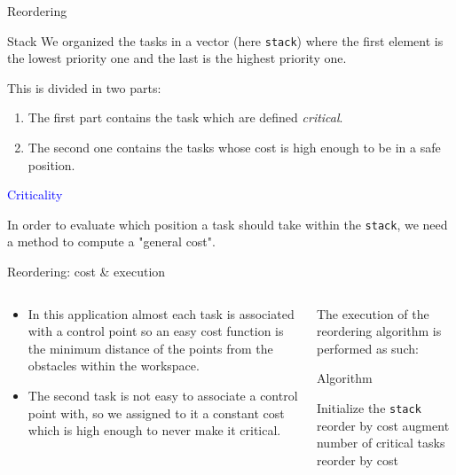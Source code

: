 \documentclass[11pt]{beamer}
\begin{document}
\begin{frame}{Reordering}

\begin{block}{Stack}
We organized the tasks in a vector (here \texttt{stack}) where the first element is the lowest priority one and the last is the highest priority one.
\end{block}
This is divided in two parts:
\begin{enumerate}
\item The first part contains the task which are defined \textit{critical}.
\item The second one contains the tasks whose cost is high enough to be in a safe position.
\end{enumerate}

\textcolor{blue}{Criticality}

In order to evaluate which position a task should take within the \texttt{stack}, we need a method to compute a "general cost".
\end{frame}

\begin{frame}{Reordering: cost \& execution}
\begin{columns}

\begin{column}{.4\textwidth}
\begin{itemize}
\item In this application almost each task is associated with a control point so an easy cost function is the minimum distance of the points from the obstacles within the workspace.
\item The second task is not easy to associate a control point with, so we assigned to it a constant cost which is high enough to never make it critical.
\end{itemize}
\end{column}

\begin{column}{.6\textwidth}
The execution of the reordering algorithm is performed as such:
\begin{block}{Algorithm}
\begin{algorithmic}[1]
\State Initialize the \texttt{stack}
\State reorder by cost
\State augment number of critical tasks
\EndIf
\EndFor
{}
\State reorder by cost
\EndFor
\end{algorithmic}
\end{block}
\end{column}

\end{columns}
\end{frame}
\end{document}
